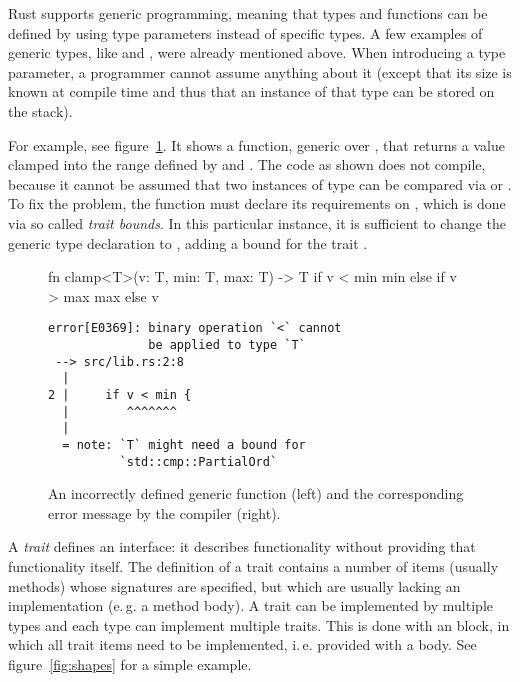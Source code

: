 Rust supports generic programming, meaning that types and functions can be defined by using type parameters instead of specific types.
A few examples of generic types, like  and , were already mentioned above.
When introducing a type parameter, a programmer cannot assume anything about it (except that its size is known at compile time and thus that an instance of that type can be stored on the stack).

For example, see figure~\ref{fig:clamp}.
It shows a function, generic over , that returns a value clamped into the range defined by  and .
The code as shown does not compile, because it cannot be assumed that two instances of type  can be compared via \code{<} or \code{>}.
To fix the problem, the function must declare its requirements on , which is done via so called \emph{trait bounds}.
In this particular instance, it is sufficient to change the generic type declaration to , adding a bound for the trait .

\vspace{4mm}
\begin{figure}[h]
  \centering
  \begin{minipage}[t]{.55\textwidth}
    \begin{rustcode}
      fn clamp<T>(v: T, min: T, max: T) -> T {
          if v < min {
              min
          } else if v > max {
              max
          } else {
              v
          }
      }
    \end{rustcode}
  \end{minipage}
  \hspace{2mm}
  \begin{minipage}[t]{.42\textwidth}
    \footnotesize
    \vspace{3mm}
    \begin{verbatim}
error[E0369]: binary operation `<` cannot
              be applied to type `T`
 --> src/lib.rs:2:8
  |
2 |     if v < min {
  |        ^^^^^^^
  |
  = note: `T` might need a bound for
          `std::cmp::PartialOrd`
    \end{verbatim}
  \end{minipage}
  \caption{
    An incorrectly defined generic function (left) and the corresponding error message by the compiler (right).
  }
  \label{fig:clamp}
\end{figure}
\vspace{4mm}

A \emph{trait} defines an interface: it describes functionality without providing that functionality itself.
The definition of a trait contains a number of items (usually methods) whose signatures are specified, but which are usually lacking an implementation (e.\,g. a method body).
A trait can be implemented by multiple types and each type can implement multiple traits.
This is done with an  block, in which all trait items need to be implemented, i.\,e. provided with a body.
See figure~\ref{fig:shapes} for a simple example.


